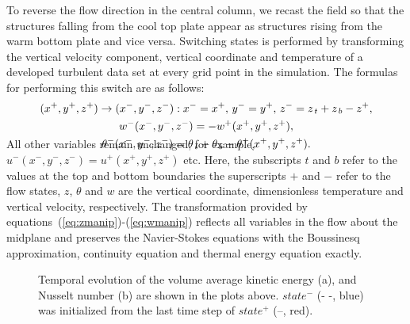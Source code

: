 \documentclass[twocolumn,10pt]{tsfp}
\begin{document}
To reverse the flow direction in the central column, we recast the field so that the structures falling from the cool top plate appear as structures rising from the warm bottom plate and vice versa.  Switching states is performed by transforming the vertical velocity component, vertical coordinate and temperature of a developed turbulent data set at every grid point in the simulation.   The formulas for performing this switch are as follows:
\vspace{-2mm}
\begin{gather}
(x^+,y^+,z^+)\rightarrow(x^-,y^-,z^-):x^-=x^+,  \,y^-=y^+, \,z^-=z_{\,t}+z_{\,b}-z^+,
\label{eq:zmanip} \\w^{-}(x^-,y^-,z^-)=-w^{+}(x^+,y^+,z^+),
\label{eq:wmanip}\\
\theta^-(x^-,y^-,z^-)=\theta_{\,t}+\theta_{\,b}-\theta^+(x^+,y^+,z^+).
\vspace{-7mm}
\label{eq:tmanip}
\end{gather}
All other variables remain unchanged, for example, $u^{-}(x^-,y^-,z^-)=u^{+}(x^+,y^+,z^+)$ etc. Here, the subscripts $t$ and $b$ refer to the values at the top and bottom boundaries
 the superscripts $+$ and $-$ refer to the flow states, $z$, $\theta$ and $w$ are the vertical coordinate, dimensionless temperature and vertical velocity, respectively.  The transformation provided by equations~(\ref{eq:zmanip})-(\ref{eq:wmanip}) reflects all variables in the flow about the midplane and preserves the Navier-Stokes equations with the Boussinesq approximation, continuity equation and thermal energy equation exactly. 
\begin{figure}
\centering
{}
\caption{Temporal evolution of the volume average kinetic energy (a), and Nusselt number (b) are shown in the plots above.  $state^-$ (- -, blue) was initialized from the last time step of $state^+$ (--, red). }
\label{fig:volstat}
\end{figure}
\end{document}
